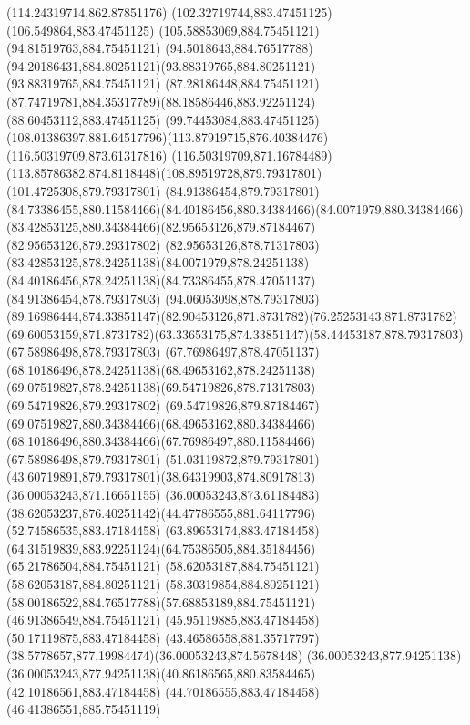 {{		\lineto(114.24319714,862.87851176)
		\closepath
		\moveto(102.32719744,883.47451125)
		\lineto(106.549864,883.47451125)
		\lineto(105.58853069,884.75451121)
		\lineto(94.81519763,884.75451121)
		\curveto(94.5018643,884.76517788)(94.20186431,884.80251121)(93.88319765,884.80251121)
		\lineto(93.88319765,884.75451121)
		\lineto(87.28186448,884.75451121)
		\curveto(87.74719781,884.35317789)(88.18586446,883.92251124)(88.60453112,883.47451125)
		\lineto(99.74453084,883.47451125)
		\curveto(108.01386397,881.64517796)(113.87919715,876.40384476)(116.50319709,873.61317816)
		\lineto(116.50319709,871.16784489)
		\curveto(113.85786382,874.8118448)(108.89519728,879.79317801)(101.4725308,879.79317801)
		\lineto(84.91386454,879.79317801)
		\curveto(84.73386455,880.11584466)(84.40186456,880.34384466)(84.0071979,880.34384466)
		\curveto(83.42853125,880.34384466)(82.95653126,879.87184467)(82.95653126,879.29317802)
		\curveto(82.95653126,878.71317803)(83.42853125,878.24251138)(84.0071979,878.24251138)
		\curveto(84.40186456,878.24251138)(84.73386455,878.47051137)(84.91386454,878.79317803)
		\lineto(94.06053098,878.79317803)
		\curveto(89.16986444,874.33851147)(82.90453126,871.8731782)(76.25253143,871.8731782)
		\curveto(69.60053159,871.8731782)(63.33653175,874.33851147)(58.44453187,878.79317803)
		\lineto(67.58986498,878.79317803)
		\curveto(67.76986497,878.47051137)(68.10186496,878.24251138)(68.49653162,878.24251138)
		\curveto(69.07519827,878.24251138)(69.54719826,878.71317803)(69.54719826,879.29317802)
		\curveto(69.54719826,879.87184467)(69.07519827,880.34384466)(68.49653162,880.34384466)
		\curveto(68.10186496,880.34384466)(67.76986497,880.11584466)(67.58986498,879.79317801)
		\lineto(51.03119872,879.79317801)
		\curveto(43.60719891,879.79317801)(38.64319903,874.80917813)(36.00053243,871.16651155)
		\lineto(36.00053243,873.61184483)
		\curveto(38.62053237,876.40251142)(44.47786555,881.64117796)(52.74586535,883.47184458)
		\lineto(63.89653174,883.47184458)
		\curveto(64.31519839,883.92251124)(64.75386505,884.35184456)(65.21786504,884.75451121)
		\lineto(58.62053187,884.75451121)
		\lineto(58.62053187,884.80251121)
		\curveto(58.30319854,884.80251121)(58.00186522,884.76517788)(57.68853189,884.75451121)
		\lineto(46.91386549,884.75451121)
		\lineto(45.95119885,883.47184458)
		\lineto(50.17119875,883.47184458)
		\curveto(43.46586558,881.35717797)(38.5778657,877.19984474)(36.00053243,874.5678448)
		\lineto(36.00053243,877.94251138)
		\curveto(36.00053243,877.94251138)(40.86186565,880.83584465)(42.10186561,883.47184458)
		\lineto(44.70186555,883.47184458)
		\lineto(46.41386551,885.75451119)
}}
